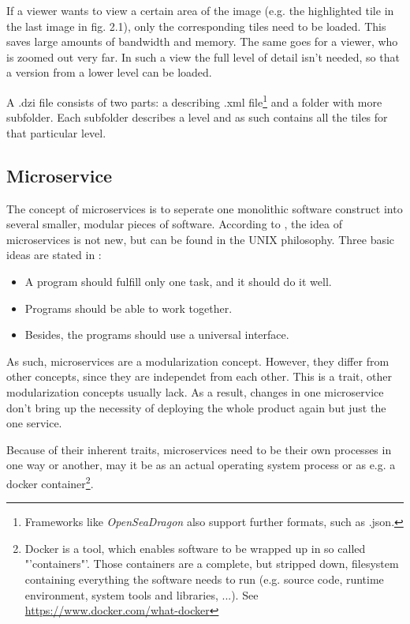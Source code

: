 If a viewer wants to view a certain area of the image (e.g. the highlighted tile in the last image in fig. 2.1), only the corresponding tiles need to be loaded. This saves large amounts of bandwidth and memory. The same goes for a viewer, who is zoomed out very far. In such a view the full level of detail isn't needed, so that a version from a lower level can be loaded.

A .dzi file consists of two parts: a describing .xml file\footnote{Frameworks like \emph{OpenSeaDragon} also support further formats, such as .json.} and a folder with more subfolder. Each subfolder describes a level and as such contains all the tiles for that particular level.

\subsection{Microservice}

The concept of microservices is to seperate one monolithic software construct into several smaller, modular pieces of software. According to \cite{Wolff16}, the idea of microservices is not new, but can be found in the UNIX philosophy. Three basic ideas are stated in \cite{Wolff16}:

\begin{itemize}
	\item A program should fulfill only one task, and it should do it well.
	\item Programs should be able to work together.
	\item Besides, the programs should use a universal interface.
\end{itemize}

As such, microservices are a modularization concept. However, they differ from other concepts, since they are independet from each other. This is a trait, other modularization concepts usually lack. As a result, changes in one microservice don't bring up the necessity of deploying the whole product again but just the one service.

Because of their inherent traits, microservices need to be their own processes in one way or another, may it be as an actual operating system process or as e.g. a docker container\footnote{Docker is a tool, which enables software to be wrapped up in so called "'containers"'. Those containers are a complete, but stripped down, filesystem containing everything the software needs to run (e.g. source code, runtime environment, system tools and libraries, ...). See \url{https://www.docker.com/what-docker}}.


